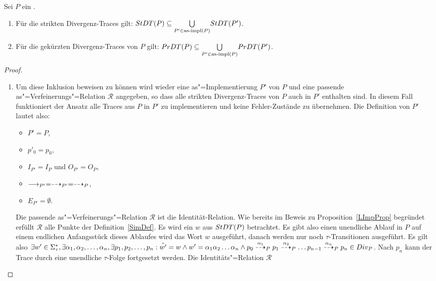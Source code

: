 \begin{Prop}
  \label{DivTraceProp}
  Sei $P$ ein \MEIO{}.
  \begin{enumerate}
    \item Für die strikten Divergenz-Traces gilt: $StDT (P) \subseteq
      \underset{P'\in\mathrm{as}\text{-}\mathrm{impl} (P)}{\bigcup} StDT (P')$.
    \item Für die gekürzten Divergenz-Traces von $P$ gilt:
      $PrDT (P) \subseteq \underset{P'\in\mathrm{as}\text{-}\mathrm{impl} (P)}{\bigcup} PrDT (P')$.
  \end{enumerate}
\end{Prop}
\begin{proof}\mbox{}
  \begin{enumerate}
    \item Um diese Inklusion beweisen zu können wird wieder eine
      as"=Implementierung $P'$ von $P$ und eine passende
      as"=Verfeinerungs"=Relation $\mathcal{R}$ angegeben, so dass alle
      strikten Divergenz-Traces von $P$ auch in $P'$ enthalten sind. In diesem
      Fall funktioniert der Ansatz alle Traces aus $P$ in $P'$ zu
      implementieren und keine Fehler-Zustände zu übernehmen. Die Definition
      von $P'$ lautet also:
      \begin{itemize}
        \item $P'=P$,
        \item $p'_0=p_0$,
        \item $I_{P'}=I_P$ und $O_{P'}=O_P$,
        \item $\must _{P'} =\may _{P'} = \may _P$,
        \item $E_{P'}=\emptyset$.
      \end{itemize}
      Die passende as"=Verfeinerungs"=Relation $\mathcal{R}$ ist die
      Identität-Relation. Wie bereits im Beweis zu Proposition~\ref{LImpProp}
      begründet erfüllt $\mathcal{R}$ alle Punkte der Definition~\ref{SimDef}.
      Es wird ein $w$ aus $StDT (P)$ betrachtet. Es gibt also einen unendliche
      Ablauf in $P$ auf einem endlichen Anfangsstück dieses Ablaufes wird das
      Wort $w$ ausgeführt, danach werden nur noch $\tau$-Transitionen
      ausgeführt. Es gilt also $\exists w' \in \Sigma _{\tau}^*, \exists
      \alpha _1, \alpha _2, \dots , \alpha _n, \exists p_1, p_2, \dots , p_n:
      \hat{w'} = w \land w' = \alpha _1\alpha _2\dots\alpha _n \land p_0
      \may[\alpha _1]_P p_1 \may[\alpha _2]_P \dots p_{n-1} \may[\alpha _n]_P
      p_n \in Div _P$. Nach $p_n$ kann der Trace durch eine unendliche
      $\tau$-Folge fortgesetzt werden. Die Identitäts"=Relation $\mathcal{R}$

\end{enumerate}
\end{proof}
